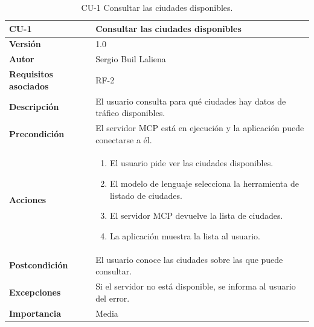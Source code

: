 \begin{table}[p]
	\centering
	\begin{tabularx}{\linewidth}{ p{} p{} }
		\toprule
		\textbf{CU-1}    & \textbf{Consultar las ciudades disponibles}\\
		\toprule
		\textbf{Versión}              & 1.0    \\
		\textbf{Autor}                & Sergio Buil Laliena \\
		\textbf{Requisitos asociados} & RF-2 \\
		\textbf{Descripción}          & El usuario consulta para qué ciudades hay datos de tráfico disponibles. \\
		\textbf{Precondición}         & El servidor MCP está en ejecución y la aplicación puede conectarse a él. \\
		\textbf{Acciones}             &
		\begin{enumerate}
			\def\labelenumi{\arabic{enumi}.}
			\tightlist
			\item El usuario pide ver las ciudades disponibles.
			\item El modelo de lenguaje selecciona la herramienta de listado de ciudades.
			\item El servidor MCP devuelve la lista de ciudades.
			\item La aplicación muestra la lista al usuario.
		\end{enumerate}\\
		\textbf{Postcondición}        & El usuario conoce las ciudades sobre las que puede consultar. \\
		\textbf{Excepciones}          & Si el servidor no está disponible, se informa al usuario del error. \\
		\textbf{Importancia}          & Media \\
		\bottomrule
	\end{tabularx}
	\caption{CU-1 Consultar las ciudades disponibles.}
	\label{tabla:cu1}
\end{table}

